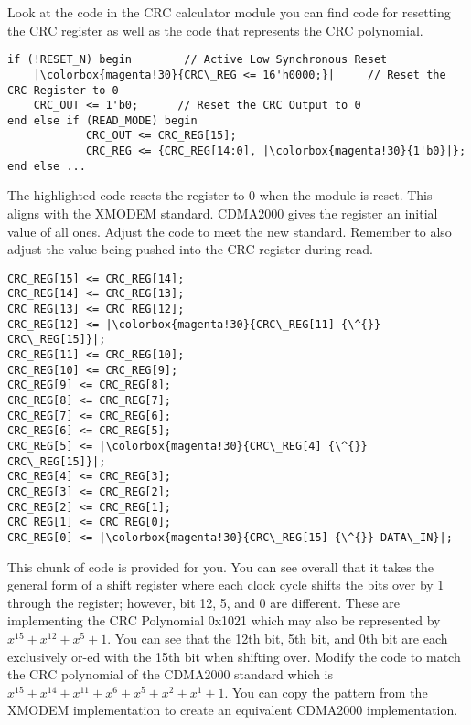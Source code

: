 Look at the code in the CRC calculator module you can find code for resetting the CRC register as well as the code that represents the CRC polynomial.
\begin{lstlisting}
if (!RESET_N) begin        // Active Low Synchronous Reset
    |\colorbox{magenta!30}{CRC\_REG <= 16'h0000;}|     // Reset the CRC Register to 0
    CRC_OUT <= 1'b0;      // Reset the CRC Output to 0
end else if (READ_MODE) begin
            CRC_OUT <= CRC_REG[15];
            CRC_REG <= {CRC_REG[14:0], |\colorbox{magenta!30}{1'b0}|};
end else ...
\end{lstlisting}
The highlighted code resets the register to 0 when the module is reset. This aligns with the XMODEM standard. CDMA2000 gives the register an initial value of all ones. Adjust the code to meet the new standard. Remember to also adjust the value being pushed into the CRC register during read.\\
\vspace{0.5cm}
\begin{lstlisting}
CRC_REG[15] <= CRC_REG[14];
CRC_REG[14] <= CRC_REG[13];
CRC_REG[13] <= CRC_REG[12];
CRC_REG[12] <= |\colorbox{magenta!30}{CRC\_REG[11] {\^{}} CRC\_REG[15]}|;
CRC_REG[11] <= CRC_REG[10];
CRC_REG[10] <= CRC_REG[9];
CRC_REG[9] <= CRC_REG[8];
CRC_REG[8] <= CRC_REG[7];
CRC_REG[7] <= CRC_REG[6];
CRC_REG[6] <= CRC_REG[5];
CRC_REG[5] <= |\colorbox{magenta!30}{CRC\_REG[4] {\^{}} CRC\_REG[15]}|;
CRC_REG[4] <= CRC_REG[3];
CRC_REG[3] <= CRC_REG[2];
CRC_REG[2] <= CRC_REG[1];
CRC_REG[1] <= CRC_REG[0];
CRC_REG[0] <= |\colorbox{magenta!30}{CRC\_REG[15] {\^{}} DATA\_IN}|;
\end{lstlisting}

This chunk of code is provided for you. You can see overall that it takes the general form of a shift register where each clock cycle shifts the bits over by 1 through the register; however, bit 12, 5, and 0 are different. These are implementing the CRC Polynomial 0x1021 which may also be represented by \(x^{15} + x^{12} + x^{5} + 1\). You can see that the 12th bit, 5th bit, and 0th bit are each exclusively or-ed with the 15th bit when shifting over. Modify the code to match the CRC polynomial of the CDMA2000 standard which is \(x^{15}+x^{14}+x^{11}+x^{6}+x^5 + x^2 +x^1 + 1\). You can copy the pattern from the XMODEM implementation to create an equivalent CDMA2000 implementation.\\
\vspace{0.5cm}